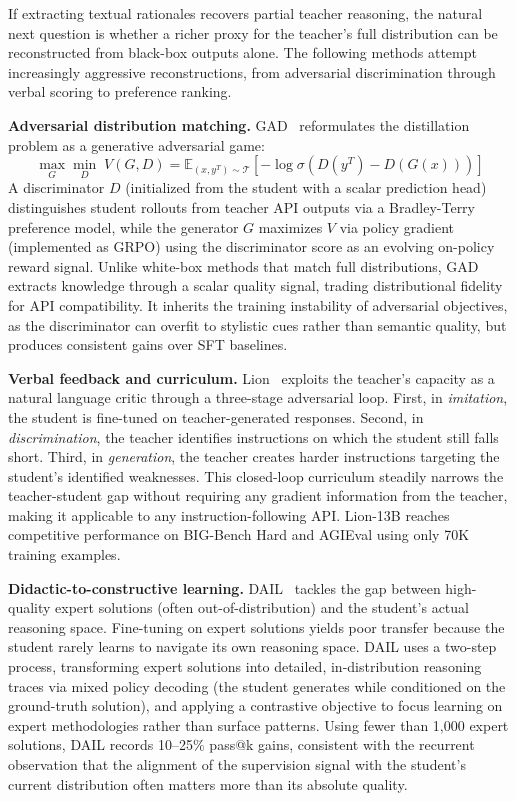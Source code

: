 \documentclass{article} %
\newcommand{\E}{\mathbb{E}}
\begin{document}
If extracting textual rationales recovers partial teacher reasoning, the natural next question is whether a richer proxy for the teacher's full distribution can be reconstructed from black-box outputs alone. The following methods attempt increasingly aggressive reconstructions, from adversarial discrimination through verbal scoring to preference ranking.

\textbf{Adversarial distribution matching.} GAD~\citep{2511.10643} reformulates the distillation problem as a generative adversarial game:
\begin{equation}
    \max_{G} \min_{D}\; V(G, D) = \E_{(x, y^T) \sim \mathcal{T}} \left[ -\log \sigma\!\left( D(y^T) - D(G(x)) \right) \right]
\end{equation}
A discriminator $D$ (initialized from the student with a scalar prediction head) distinguishes student rollouts from teacher API outputs via a Bradley-Terry preference model, while the generator $G$ maximizes $V$ via policy gradient (implemented as GRPO) using the discriminator score as an evolving on-policy reward signal. Unlike white-box methods that match full distributions, GAD extracts knowledge through a scalar quality signal, trading distributional fidelity for API compatibility. It inherits the training instability of adversarial objectives, as the discriminator can overfit to stylistic cues rather than semantic quality, but produces consistent gains over SFT baselines.

\textbf{Verbal feedback and curriculum.} Lion~\citep{2305.12870} exploits the teacher's capacity as a natural language critic through a three-stage adversarial loop. First, in \emph{imitation}, the student is fine-tuned on teacher-generated responses. Second, in \emph{discrimination}, the teacher identifies instructions on which the student still falls short. Third, in \emph{generation}, the teacher creates harder instructions targeting the student's identified weaknesses. This closed-loop curriculum steadily narrows the teacher-student gap without requiring any gradient information from the teacher, making it applicable to any instruction-following API. Lion-13B reaches competitive performance on BIG-Bench Hard and AGIEval using only 70K training examples.

\textbf{Didactic-to-constructive learning.} DAIL~\citep{2602.02405} tackles the gap between high-quality expert solutions (often out-of-distribution) and the student's actual reasoning space. Fine-tuning on expert solutions yields poor transfer because the student rarely learns to navigate its own reasoning space. DAIL uses a two-step process, transforming expert solutions into detailed, in-distribution reasoning traces via mixed policy decoding (the student generates while conditioned on the ground-truth solution), and applying a contrastive objective to focus learning on expert methodologies rather than surface patterns. Using fewer than 1,000 expert solutions, DAIL records 10--25\% pass@k gains, consistent with the recurrent observation that the alignment of the supervision signal with the student's current distribution often matters more than its absolute quality.
\end{document}
